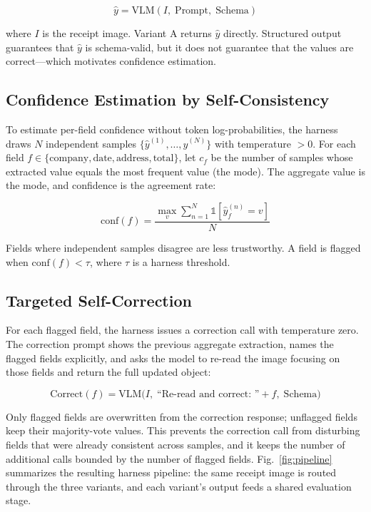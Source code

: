 \documentclass[conference]{IEEEtran}
\begin{document}
\[
\hat{y} = \text{VLM}(I,\; \text{Prompt},\; \text{Schema})
\]

where \(I\) is the receipt image. Variant A returns \(\hat{y}\) directly. Structured output guarantees that \(\hat{y}\) is schema-valid, but it does not guarantee that the values are correct---which motivates confidence estimation.

\subsection{Confidence Estimation by Self-Consistency}
To estimate per-field confidence without token log-probabilities, the harness draws \(N\) independent samples \(\{\hat{y}^{(1)}, \ldots, \hat{y}^{(N)}\}\) with temperature \(> 0\). For each field \(f \in \{\text{company}, \text{date}, \text{address}, \text{total}\}\), let \(c_f\) be the number of samples whose extracted value equals the most frequent value (the mode). The aggregate value is the mode, and confidence is the agreement rate:

\[
\text{conf}(f) = \frac{\max_v \sum_{n=1}^{N} \mathbb{1}[\hat{y}^{(n)}_f = v]}{N}
\]

Fields where independent samples disagree are less trustworthy. A field is flagged when \(\text{conf}(f) < \tau\), where \(\tau\) is a harness threshold.

\subsection{Targeted Self-Correction}
For each flagged field, the harness issues a correction call with temperature zero. The correction prompt shows the previous aggregate extraction, names the flagged fields explicitly, and asks the model to re-read the image focusing on those fields and return the full updated object:

\[
\text{Correct}(f) = \text{VLM}\big(I,\; \text{``Re-read and correct: ''} + f,\; \text{Schema}\big)
\]

Only flagged fields are overwritten from the correction response; unflagged fields keep their majority-vote values. This prevents the correction call from disturbing fields that were already consistent across samples, and it keeps the number of additional calls bounded by the number of flagged fields. Fig.~\ref{fig:pipeline} summarizes the resulting harness pipeline: the same receipt image is routed through the three variants, and each variant's output feeds a shared evaluation stage.
\end{document}
